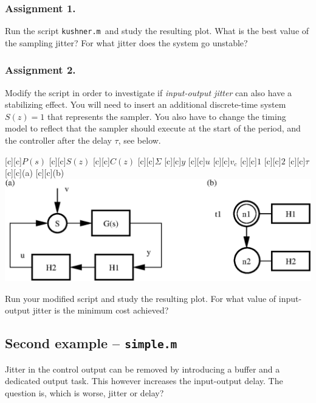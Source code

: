 \documentclass[final,twoside]{rapport}  %
\begin{document}
\subsubsection{Assignment 1.}

Run the script \texttt{kushner.m }and study the resulting plot. What
is the best value of the sampling jitter? For what jitter does the
system go unstable?

\subsubsection{Assignment 2.}

Modify the script in order to investigate if {\em input-output jitter}
can also have a stabilizing effect. You will need to insert an additional
discrete-time system $S(z)=1$ that represents the sampler. You also have
to change the timing model to reflect that the sampler should execute
at the start of the period, and the controller after the delay $\tau$,
see below.

\bigskip

  \centerline{
    \small
  [c][c]{$P(s)$}
  [c][c]{$S(z)$}
  [c][c]{$C(z)$}
  [c][c]{$\Sigma$}
  [c][c]{$y$}
  [c][c]{$u$}
  [c][c]{$v_c$}
  [c][c]{$1$}
  [c][c]{$2$}
  [c][c]{$\tau$}
  [c][c]{\small (a)}
  [c][c]{\small (b)}
  \includegraphics[scale=0.63]{kushner2.eps}
  }

Run your modified script and study the resulting plot. For what value
of input-output jitter is the minimum cost achieved?

\medskip
\subsection*{Second example -- \texttt{simple.m}}

Jitter in the control output can be removed by introducing a buffer
and a dedicated output task. This however increases the input-output
delay. The question is, which is worse, jitter or delay?
\end{document}
